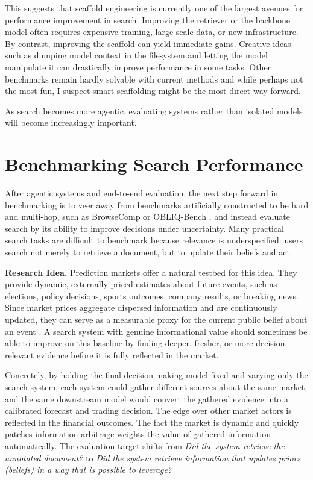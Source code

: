 This suggests that scaffold engineering is currently one of the largest avenues for performance improvement in search. Improving the retriever or the backbone model often requires expensive training, large-scale data, or new infrastructure. By contrast, improving the scaffold can yield immediate gains. Creative ideas such as dumping model context in the filesystem and letting the model manipulate it  can drastically improve performance in some tasks. Other benchmarks remain hardly solvable with current methods  and while perhaps not the most fun, I suspect smart scaffolding might be the most direct way forward.

As search becomes more agentic, evaluating systems rather than isolated models will become increasingly important.


\section{Benchmarking Search Performance}

After agentic systems and end-to-end evaluation, the next step forward in benchmarking is to veer away from benchmarks artificially constructed to be hard and multi-hop, such as BrowseComp \cite{wei2025browsecompsimplechallengingbenchmark} or OBLIQ-Bench , and instead evaluate search by its ability to improve decisions under uncertainty. Many practical search tasks are difficult to benchmark because relevance is underspecified: users search not merely to retrieve a document, but to update their beliefs and act.


\noindent\textbf{Research Idea.} 
Prediction markets offer a natural testbed for this idea. They provide dynamic, externally priced estimates about future events, such as elections, policy decisions, sports outcomes, company results, or breaking news. Since market prices aggregate dispersed information and are continuously updated, they can serve as a measurable proxy for the current public belief about an event . A search system with genuine informational value should sometimes be able to improve on this baseline by finding deeper, fresher, or more decision-relevant evidence before it is fully reflected in the market. 

Concretely, by holding the final decision-making model fixed and varying only the search system, each system could gather different sources about the same market, and the same downstream model would convert the gathered evidence into a calibrated forecast and trading decision. The edge over other market actors is reflected in the financial outcomes. The fact the market is dynamic and quickly patches information arbitrage weights the value of gathered information automatically.
The evaluation target shifts from \emph{Did the system retrieve the annotated document?} to \emph{Did the system retrieve information that updates priors (beliefs) in a way that is possible to leverage?}

